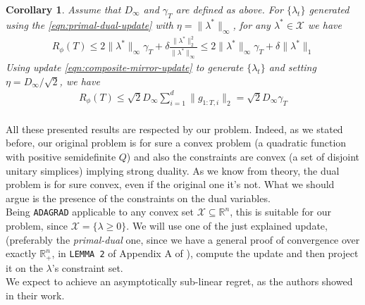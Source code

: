 \documentclass[notitlepage]{article}
\newtheorem{corollary}{Corollary}[section]
\begin{document}
\begin{corollary}
  Assume that $D_\infty$ and $\gamma_T$ are defined as above. For $\{ \lambda_t \}$ generated using the \eqref{eqn:primal-dual-update} with $\eta = \|\lambda^*\|_\infty$, for any $\lambda^* \in \mathcal{X}$ we have
  \begin{align*}
    R_\phi(T) \le 2 \|\lambda^*\|_\infty \gamma_T + \delta \frac{\|\lambda^*\|_2^2}{\|\lambda^*\|_\infty} \le 2 \|\lambda^*\|_\infty \gamma_T + \delta \|\lambda^*\|_1
  \end{align*}
  Using update \eqref{eqn:composite-mirror-update} to generate $\{\lambda_t\}$ and setting $\eta = D_\infty / \sqrt{2}$, we have
  \begin{align*}
    R_\phi(T) \le \sqrt{2} D_\infty \sum_{i=1}^d \| g_{1:T,i} \|_2 = \sqrt{2} D_\infty \gamma_T \\[1em]
  \end{align*}
\end{corollary}
All these presented results are respected by our problem. Indeed, as we stated before, our original problem is for sure a convex problem (a quadratic function with positive semidefinite $Q$) and also the constraints are convex (a set of disjoint 
unitary simplices) implying strong duality. As we know from theory, the dual problem is for sure convex, even if the original one it's not. What we should argue is the presence of the constraints on the dual variables.\\
Being \texttt{ADAGRAD} applicable to any convex set $\mathcal{X} \subseteq \mathbb{R}^n$, this is suitable for our problem, since $\mathcal{X} = \{\lambda \ge 0\}$. We will use one of the just explained update, (preferably 
the \textit{primal-dual} one, since we have a general proof of convergence over exactly $\mathbb{R}_+^n$, in \texttt{LEMMA 2} of Appendix A of \cite{Frangioni2017}), compute the update and then project it on the $\lambda$'s constraint set.\\
We expect to achieve an asymptotically sub-linear regret, as the authors showed in their work.
\end{document}
